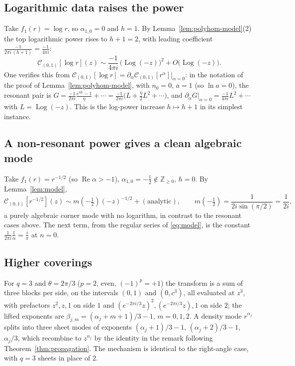 \documentclass[pdflatex,sn-mathphys-num]{sn-jnl}%
\newcommand{\Z}{\mathbb{Z}}
\newcommand{\Cau}{\mathcal{C}}
\newcommand{\Real}{\operatorname{Re}}
\newcommand{\Log}{\operatorname{Log}}
\theoremstyle{thmstyleone}
\theoremstyle{thmstyletwo}
\theoremstyle{thmstylethree}
\begin{document}
\subsection{Logarithmic data raises the power}
Take $f_1(r)=\log r$, so $\alpha_{1,0}=0$ and $h=1$. By
Lemma~\ref{lem:polyhom-model}(2) the top logarithmic power rises to $h+1=2$,
with leading coefficient $\frac{-1}{2\pi i\,(h+1)}=\frac{-1}{4\pi i}$:
\[
  \Cau_{(0,1)}[\log r](z)\sim\frac{-1}{4\pi i}\,\bigl(\Log(-z)\bigr)^{2}
   +O\bigl(\Log(-z)\bigr).
\]
One verifies this from $\Cau_{(0,1)}[\log r]=\partial_\alpha
\Cau_{(0,1)}[r^{\alpha}]\big|_{\alpha=0}$: in the notation of the proof of
Lemma~\ref{lem:polyhom-model}, with $n_0=0$, $a=1$ (so $\ln a=0$), the resonant
pair is $G=\frac{-1}{2\pi i}\frac{e^{\eta L}-1}{\eta}+\cdots
=\frac{-1}{2\pi i}\bigl(L+\tfrac{\eta}{2}L^{2}+\cdots\bigr)$, and
$\partial_\alpha G|_{\alpha=0}=\frac{-1}{4\pi i}L^{2}+\cdots$ with
$L=\Log(-z)$. This is the log-power increase $h\mapsto h+1$ in its simplest instance.

\subsection{A non-resonant power gives a clean algebraic mode}
Take $f_1(r)=r^{-1/2}$ (so $\Real\alpha>-1$), $\alpha_{1,0}=-\tfrac12
\notin\Z_{\ge0}$, $h=0$. By Lemma~\ref{lem:model},
\[
  \Cau_{(0,1)}[r^{-1/2}](z)\sim m(-\tfrac12)(-z)^{-1/2}+(\text{analytic}),
  \qquad
  m(-\tfrac12)=\frac{1}{2i\sin(\pi/2)}=\frac{1}{2i},
\]
a purely algebraic corner mode with no logarithm, in contrast to the resonant
cases above. The next term, from the regular series of \eqref{eq:model}, is the
constant $\frac{1}{2\pi i}\frac{1}{\alpha}=\frac{i}{\pi}$ at $n=0$.

\subsection{Higher coverings}
For $q=3$ and $\theta=2\pi/3$ ($p=2$, even, $(-1)^{p}=+1$) the transform is a
sum of three blocks per side, on the intervals $(0,1)$ and $(0,c^{3})$, all
evaluated at $z^{3}$, with prefactors $z^{2},z,1$ on side $1$ and
$(e^{-2\pi i/3}z)^{2},(e^{-2\pi i/3}z),1$ on side $2$; the lifted exponents are
$\beta_{j,m}=(\alpha_j+m+1)/3-1$, $m=0,1,2$. A density mode $r^{\alpha_j}$ splits
into three sheet modes of exponents $(\alpha_j+1)/3-1$, $(\alpha_j+2)/3-1$,
$\alpha_j/3$, which recombine to $z^{\alpha_j}$ by the identity in the remark
following Theorem~\ref{thm:propagation}. The mechanism is identical to the
right-angle case, with $q=3$ sheets in place of $2$.
\end{document}
